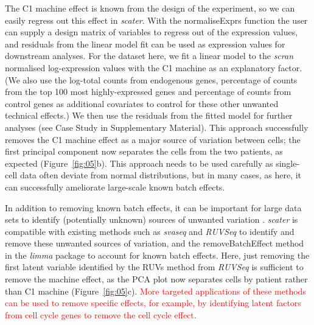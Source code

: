 \documentclass{bioinfo}
\newcommand{\revised}[1]{\textcolor{red}{#1}}
\begin{document}
The C1 machine effect is known from the design of the experiment, so we
can easily regress out this effect in \emph{scater}. With the
normaliseExprs function the user can supply a design matrix of variables
to regress out of the expression values, and residuals from the linear
model fit can be used as expression values for downstream analyses. For
the dataset here, we fit a linear model to the \emph{scran} normalised
log-expression values with the C1 machine as an explanatory factor. (We
also use the log-total counts from endogenous genes, percentage of
counts from the top 100 most highly-expressed genes and percentage of
counts from control genes as additional covariates to control for these other unwanted technical effects.) We then use the
residuals from the fitted model for further analyses (see Case Study in
Supplementary Material). This approach successfully removes the C1
machine effect as a major source of variation between cells; the first
principal component now separates the cells from the two patients, as
expected (Figure~\ref{fig:05}b). This approach needs to be used carefully
as single-cell data often deviate from normal distributions, but in many
cases, as here, it can successfully ameliorate large-scale known batch
effects.

In addition to removing known batch effects, it can be important for
large data sets to identify (potentially unknown) sources of unwanted variation
\citep{Leek2010-nq,Hicks2015-qy,Grun2015-xi}.
\emph{scater} is compatible with existing methods such as \emph{svaseq}
\citep{Leek2007-rg,Leek2014-nu} and \emph{RUVSeq} \citep{Risso2014-np} to
identify and remove these unwanted sources of variation, and the
removeBatchEffect method in the \emph{limma} package \citep{Ritchie2015-so}
to account for known batch effects. Here, just removing the first latent
variable identified by the RUVs method from \emph{RUVSeq} is sufficient to
remove the machine effect, as the PCA plot now separates cells by patient
rather than C1 machine (Figure~\ref{fig:05}c). \revised{More targeted applications of these methods can be used to remove specific effects, for example, by identifying latent factors from cell cycle genes to remove the cell cycle effect.}

\end{document}
